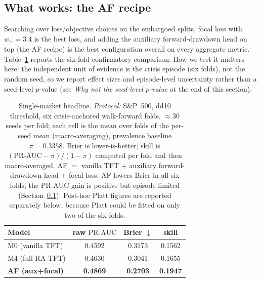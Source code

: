 \documentclass[11pt,a4paper]{article}
\newcommand{\prauc}{\mbox{PR-AUC}}
\begin{document}
\subsection{What works: the AF recipe}
\label{sec:res-af}
Searching over loss/objective choices on the embargoed splits, focal loss with
$w_{+}=3.4$ is the best loss, and adding the auxiliary forward-drawdown head
on top (the AF recipe) is the best configuration overall on every aggregate
metric. Table~\ref{tab:af} reports the six-fold confirmatory comparison.
How we test it matters here: the independent unit
of evidence is the crisis episode (six folds), not the random seed, so we
report effect sizes and episode-level uncertainty rather than a seed-level
$p$-value (see \emph{Why not the seed-level $p$-value} at the end of this
section).

\begin{table}[h]
\centering\small
\caption{Single-market headline. \emph{Protocol:} S\&P~500, dd10 threshold,
six crisis-anchored walk-forward folds, $\approx$30 seeds per fold; each cell
is the mean over folds of the per-seed mean (macro-averaging), prevalence
baseline $\pi=0.3358$. Brier is lower-is-better; skill is
$(\prauc-\pi)/(1-\pi)$ computed per fold and then macro-averaged. AF $=$ vanilla
TFT $+$ auxiliary forward-drawdown head $+$ focal loss. AF lowers Brier in all
six folds; the $\prauc$ gain is positive but episode-limited
(Section~\ref{sec:res-af}). Post-hoc Platt figures are reported separately
below, because Platt could be fitted on only two of the six folds.}
\label{tab:af}
\begin{tabular}{lccc}
\toprule
Model & raw $\prauc$ & Brier $\downarrow$ & skill \\
\midrule
M0 (vanilla TFT)        & 0.4592 & 0.3173 & 0.1562 \\
M4 (full RA-TFT)        & 0.4630 & 0.3041 & 0.1655 \\
\textbf{AF (aux+focal)} & \textbf{0.4869} & \textbf{0.2703} & \textbf{0.1947} \\
\bottomrule
\end{tabular}
\end{table}
\end{document}
